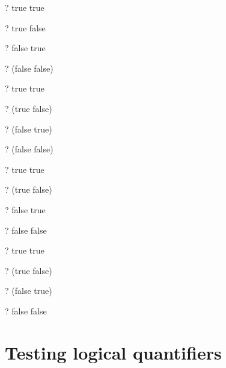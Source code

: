 \documentclass{article}
\begin{document}
\begin{zed} \vdash?  true \lor true \end{zed}
\begin{zed} \vdash?  true \lor false \end{zed}
\begin{zed} \vdash?  false \lor true \end{zed}
\begin{zed} \vdash?  \lnot(false \lor false) \end{zed}

\begin{zed} \vdash?  true \land true \end{zed}
\begin{zed} \vdash?  \lnot(true \land false) \end{zed}
\begin{zed} \vdash?  \lnot(false \land true) \end{zed}
\begin{zed} \vdash?  \lnot(false \land false) \end{zed}

\begin{zed} \vdash?  true \implies true \end{zed}
\begin{zed} \vdash?  \lnot(true \implies false) \end{zed}
\begin{zed} \vdash?  false \implies true \end{zed}
\begin{zed} \vdash?  false \implies false \end{zed}

\begin{zed} \vdash?  true \iff true \end{zed}
\begin{zed} \vdash?  \lnot(true \iff false) \end{zed}
\begin{zed} \vdash?  \lnot(false \iff true) \end{zed}
\begin{zed} \vdash?  false \iff false \end{zed}


\section{Testing logical quantifiers}
\end{document}
